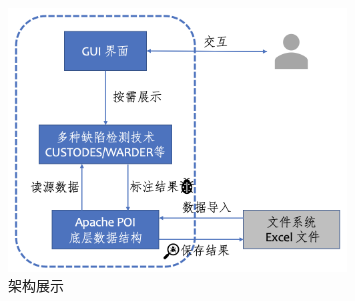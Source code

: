 \begin{figure}[tp]   
    \centering
    \includegraphics[width=0.8\textwidth]{figure/sg/sguard-framework.png}
    \caption{\sg 架构展示}
    \label{figure-sg-framework}
\end{figure}